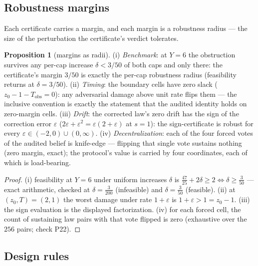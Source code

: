 \documentclass[10pt,twocolumn]{article}
\theoremstyle{definition}
\newtheorem{proposition}{Proposition}
\begin{document}
\subsection{Robustness margins}\label{margins}

Each certificate carries a margin, and each margin is a robustness
radius --- the size of the perturbation the certificate's verdict
tolerates.

\begin{proposition}[margins as radii]\label{prop:margins}
(i) \emph{Benchmark}: at \(Y = 6\) the obstruction survives any
per-cap increase \(\delta < 3/50\) of both caps and only there: the
certificate's margin \(3/50\) is exactly the per-cap robustness radius
(feasibility returns at \(\delta = 3/50\)). (ii) \emph{Timing}: the
boundary cells have zero slack (\(z_0 - 1 - T_{\mathrm{obs}} = 0\)):
any adversarial damage above unit rate flips them --- the inclusive
convention is exactly the statement that the audited identity holds on
zero-margin cells. (iii) \emph{Drift}: the corrected law's zero drift
has the sign of the correction error \(\varepsilon\) (\(2\varepsilon +
\varepsilon^2 = \varepsilon(2 + \varepsilon)\) at \(s = 1\)): the
sign-certificate is robust for every \(\varepsilon \in (-2, 0) \cup
(0, \infty)\). (iv) \emph{Decentralization}: each of the four forced
votes of the audited belief is knife-edge --- flipping that single vote
sustains nothing (zero margin, exact); the protocol's value is carried
by four coordinates, each of which is load-bearing.
\end{proposition}

\begin{proof}
(i) feasibility at \(Y = 6\) under uniform increases \(\delta\) is
\(\tfrac{47}{25} + 2\delta \ge 2 \iff \delta \ge
\tfrac{3}{50}\) --- exact arithmetic, checked at \(\delta =
\tfrac{3}{200}\) (infeasible) and \(\delta = \tfrac{3}{50}\)
(feasible). (ii) at \((z_0, T) = (2, 1)\) the worst damage under rate
\(1 + \varepsilon\) is \(1 + \varepsilon > 1 = z_0 - 1\). (iii) the
sign evaluation is the displayed factorization. (iv) for each forced
cell, the count of sustaining law pairs with that vote flipped is zero
(exhaustive over the \(256\) pairs; check P22).
\end{proof}

\subsection{Design rules}\label{rules}
\end{document}
